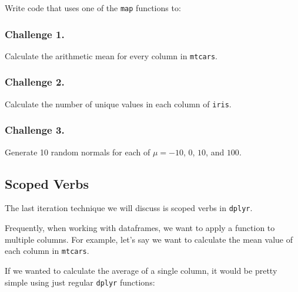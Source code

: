 \documentclass[
]{book}
\newenvironment{Shaded}{\begin{snugshade}}{\end{snugshade}}
\newcommand{\CommentTok}[1]{\textcolor[rgb]{0.56,0.35,0.01}{\textit{#1}}}
\newcommand{\DataTypeTok}[1]{\textcolor[rgb]{0.13,0.29,0.53}{#1}}
\newcommand{\KeywordTok}[1]{\textcolor[rgb]{0.13,0.29,0.53}{\textbf{#1}}}
\newcommand{\NormalTok}[1]{#1}
\newcommand{\OperatorTok}[1]{\textcolor[rgb]{0.81,0.36,0.00}{\textbf{#1}}}
\newcommand{\StringTok}[1]{\textcolor[rgb]{0.31,0.60,0.02}{#1}}
\begin{document}
Write code that uses one of the \texttt{map} functions to:

\hypertarget{challenge-1.-14}{%
\subsubsection*{Challenge 1.}\label{challenge-1.-14}}

Calculate the arithmetic mean for every column in \texttt{mtcars}.

\hypertarget{challenge-2.-13}{%
\subsubsection*{Challenge 2.}\label{challenge-2.-13}}

Calculate the number of unique values in each column of \texttt{iris}.

\hypertarget{challenge-3.-10}{%
\subsubsection*{Challenge 3.}\label{challenge-3.-10}}

Generate 10 random normals for each of \(\mu = -10\), \(0\), \(10\), and \(100\).

\hypertarget{scoped-verbs}{%
\subsection{Scoped Verbs}\label{scoped-verbs}}

The last iteration technique we will discuss is scoped verbs in \texttt{dplyr}.

Frequently, when working with dataframes, we want to apply a function to multiple columns. For example, let's say we want to calculate the mean value of each column in \texttt{mtcars}.

If we wanted to calculate the average of a single column, it would be pretty simple using just regular \texttt{dplyr} functions:

\begin{Shaded}
\end{Shaded}
\end{document}
